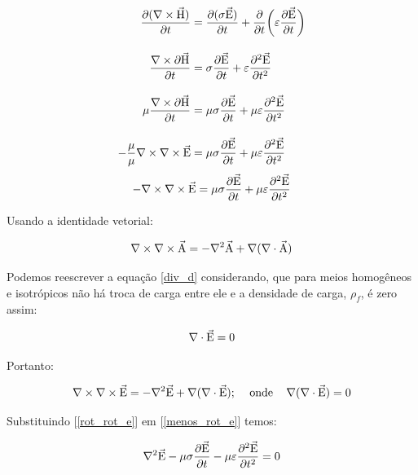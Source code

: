             
\begin{align*}
\dfrac{\partial (\nabla \times \vec{\textrm{H}})}{\partial t} & = \dfrac{\partial (\sigma \vec{\textrm{E}})}{\partial t} + \dfrac{\partial}{\partial t} \bigg(\varepsilon \dfrac{\partial \vec{\textrm{E}}}{\partial t}\bigg)\\[10pt]
             \dfrac{\nabla \times \partial \vec{\textrm{H}}}{\partial t} & = \sigma \dfrac{\partial \vec{\textrm{E}}}{\partial t} + \varepsilon \dfrac{\partial^2 \vec{\textrm{E}}}{\partial t^2} \\[10pt]
             \mu \dfrac{\nabla \times \partial \vec{\textrm{H}}}{\partial t} & = \mu \sigma \dfrac{\partial \vec{\textrm{E}}}{\partial t} + \mu \varepsilon \dfrac{\partial^2 \vec{\textrm{E}}}{\partial t^2} \\[10pt]
             -\dfrac{\mu}{\mu} \nabla \times \nabla \times \vec{\textrm{E}} & = \mu \sigma \dfrac{\partial \vec{\textrm{E}}}{\partial t} + \mu \varepsilon \dfrac{\partial^2 \vec{\textrm{E}}}{\partial t^2}
             \end{align*}
             \begin{equation}
                \label{menos_rot_e}
              - \nabla \times \nabla \times \vec{\textrm{E}} = \mu \sigma \dfrac{\partial \vec{\textrm{E}}}{\partial t} + \mu \varepsilon \dfrac{\partial^2 \vec{\textrm{E}}}{\partial t^2}
             \end{equation}
                
            Usando a identidade vetorial:
            
            \begin{equation}
             \nabla \times \nabla \times \vec{\textrm{A}} = -\nabla^2 \vec{\textrm{A}} + \nabla(\nabla \cdot \vec{\textrm{A}})
            \end{equation}
            
            Podemos reescrever a equação \ref{div_d} considerando, que para meios homogêneos e isotrópicos não há troca de carga entre ele e a densidade de carga, $\rho_f$, é zero assim:
            
            \begin{equation}
             \nabla \cdot \vec{\textrm{E}} = 0
            \end{equation}
            
            Portanto:
            
            \begin{equation}
             \label{rot_rot_e}
             \nabla \times \nabla \times \vec{\textrm{E}} = -\nabla^2 \vec{\textrm{E}} + \nabla(\nabla \cdot \vec{\textrm{E}});\,\,\,\,\,\,\, \textrm{onde}\,\,\,\,\,\,\,   \nabla(\nabla \cdot \vec{\textrm{E}})=0
            \end{equation}
            
            Substituindo [\ref{rot_rot_e}] em [\ref{menos_rot_e}] temos:
            
            \begin{equation}
             \nabla^2 \vec{\textrm{E}} - \mu \sigma \dfrac{\partial \vec{\textrm{E}}}{\partial t} - \mu \varepsilon \dfrac{\partial^2 \vec{\textrm{E}}}{\partial t^2} = 0
            \end{equation}
            
